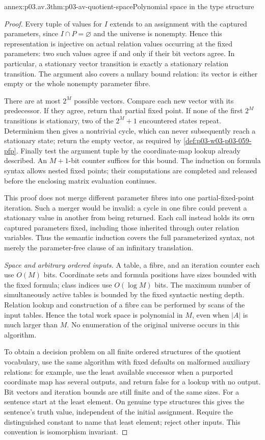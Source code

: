 \begin{annexitem}{annex:p03.av.3}{thm:p03-av-quotient-space}{Polynomial space in the type structure}
\begin{proof}
Every tuple of values for \(I\) extends to an assignment with the
captured parameters, since \(I\cap P=\varnothing\) and the
universe is nonempty. Hence this representation is injective on
actual relation values occurring at the fixed parameters: two such
values agree if and only if their bit vectors agree. In particular,
a stationary vector transition is exactly a stationary relation
transition. The argument also covers a nullary bound relation: its
vector is either empty or the whole nonempty parameter fibre.

There are at most \(2^M\) possible vectors. Compare each new
vector with its predecessor. If they agree, return that partial
fixed point. If none of the first \(2^M\) transitions is
stationary, two of the \(2^M+1\) encountered states repeat.
Determinism then gives a nontrivial cycle, which can never subsequently
reach a stationary state; return the empty vector, as required by
\cref{def:p03-w03-p03-059-pfp}. Finally test the argument tuple
by the coordinate-map lookup already described. An \(M+1\)-bit
counter suffices for this bound. The induction on formula syntax
allows nested fixed points; their computations are completed and
released before the enclosing matrix evaluation continues.

This proof does not merge different parameter fibres into one
partial-fixed-point iteration. Such a merger would be invalid: a
cycle in one fibre could prevent a stationary value in another from
being returned. Each call instead holds its own captured parameters
fixed, including those inherited through outer relation variables.
Thus the semantic induction covers the full parameterized syntax,
not merely the parameter-free clause of an infinitary translation.

\emph{Space and arbitrary ordered inputs.} A table, a fibre, and
an iteration counter each use \(O(M)\) bits. Coordinate sets
and formula positions have sizes bounded with the fixed formula;
class indices use \(O(\log M)\) bits. The maximum number of
simultaneously active tables is bounded by the fixed syntactic nesting
depth. Relation lookup and construction of a fibre can be performed
by scans of the input tables. Hence the total work space is polynomial
in \(M\), even when \(|A|\) is much larger than \(M\).
No enumeration of the original universe occurs in this algorithm.

To obtain a decision problem on all finite ordered structures of the
quotient vocabulary, use the same algorithm with fixed defaults on
malformed auxiliary relations: for example, use the least available
successor when a purported coordinate map has several outputs, and
return false for a lookup with no output. Bit vectors and iteration
bounds are still finite and of the same sizes. For a sentence start
at the least element. On genuine type structures this gives the
sentence's truth value, independent of the initial assignment.
Require the distinguished constant to name that least element;
reject other inputs. This convention is isomorphism invariant.


\end{proof}
\end{annexitem}
